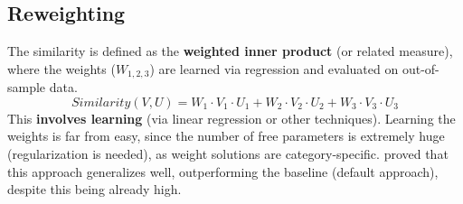 \subsection{Reweighting}
The similarity is defined as the \textbf{weighted inner product} (or related measure), where the weights ($W_{1,2,3}$) are learned via regression and evaluated on out-of-sample data.
\[
    Similarity(V,U) = W_1 \cdot V_1 \cdot U_1 + W_2 \cdot V_2 \cdot U_2 + W_3 \cdot V_3 \cdot U_3
\]
This \textbf{involves learning} (via linear regression or other techniques). Learning the weights is far from easy, since the number of free parameters is extremely huge (regularization is needed), as weight solutions are category-specific.
\notedv \cite{peterson} proved that this approach generalizes well, outperforming the baseline (default approach), despite this being already high.\\

